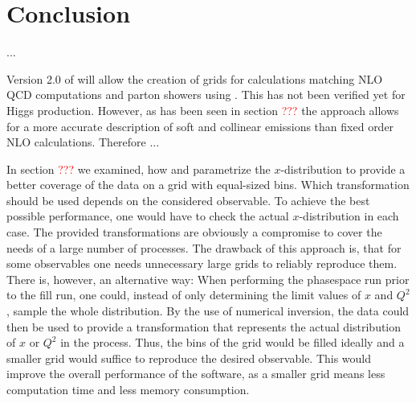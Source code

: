 
\chapter{Conclusion}
... 

Version 2.0 of \mcgrid{} will allow the creation of grids for calculations matching NLO QCD computations and parton showers using \mcatnlo{}.
This has not been verified yet for Higgs production.
However, as has been seen in section \textcolor{red}{???} the \mcatnlo{} approach allows for a more accurate description of soft and collinear emissions than fixed order NLO calculations.
Therefore ...


In section \textcolor{red}{???} we examined, how \appl{} and \fnlo{} parametrize the $x$-distribution to provide a better coverage of the data on a grid with equal-sized bins.
Which transformation should be used depends on the considered observable.
To achieve the best possible performance, one would have to check the actual $x$-distribution in each case.
The provided transformations are obviously a compromise to cover the needs of a large number of processes.
The drawback of this approach is, that for some observables one needs unnecessary large grids to reliably reproduce them.
There is, however, an alternative way: When performing the phasespace run prior to the fill run, one could, instead of only determining the limit values of $x$ and $Q^2$, sample the whole distribution.
By the use of numerical inversion, the data could then be used to provide a transformation that represents the actual distribution of $x$ or $Q^2$ in the process.
Thus, the bins of the grid would be filled ideally and a smaller grid would suffice to reproduce the desired observable.
This would improve the overall performance of the software, as a smaller grid means less computation time and less memory consumption.

